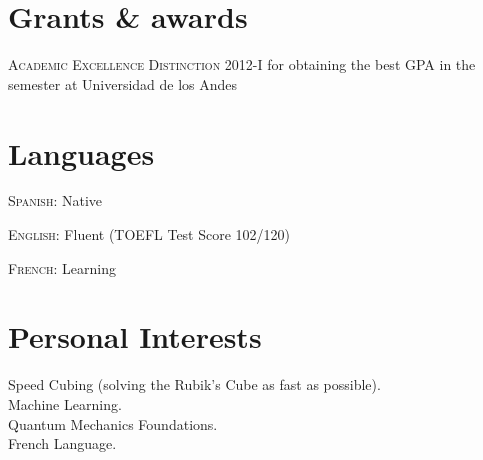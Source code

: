 \documentclass[10pt, a4paper]{article}
\newcommand{\years}[1]{\marginnote{\scriptsize #1}}
\begin{document}
\section*{Grants \& awards}
\noindent

\years{2012} \textsc{Academic Excellence Distinction 2012-I} for obtaining the best GPA in the semester at Universidad de los Andes\\

\section*{Languages}

\textsc{Spanish}: Native 

\textsc{English}: Fluent (TOEFL Test Score 102/120)

\textsc{French}: Learning
\section*{Personal Interests}

Speed Cubing (solving the Rubik’s Cube as fast as possible).\\
Machine Learning.\\
Quantum Mechanics Foundations. \\
French Language.\\ 
\end{document}
